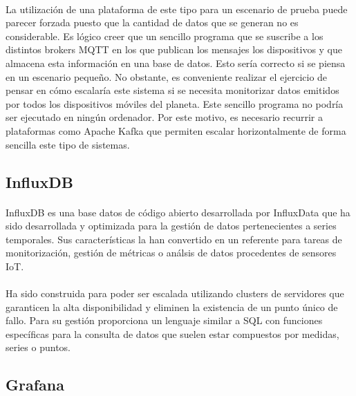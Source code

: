 \documentclass[12pt, a4paper]{article}
\begin{document}
        \paragraph{}
        La utilización de una plataforma de este tipo para un escenario de prueba puede parecer forzada puesto que la cantidad de datos que se generan no es considerable. Es lógico creer que un sencillo programa que se suscribe a los distintos brokers MQTT en los que publican los mensajes los dispositivos y que almacena esta información en una base de datos. Esto sería correcto si se piensa en un escenario pequeño. No obstante, es conveniente realizar el ejercicio de pensar en cómo escalaría este sistema si se necesita monitorizar datos emitidos por todos los dispositivos móviles del planeta. Este sencillo programa no podría ser ejecutado en ningún ordenador. Por este motivo, es necesario recurrir a plataformas como Apache Kafka que permiten escalar horizontalmente de forma sencilla este tipo de sistemas.
        
        \subsection{InfluxDB}

        \paragraph{}
        InfluxDB es una base datos de código abierto desarrollada por InfluxData que ha sido desarrollada y optimizada para la gestión de datos pertenecientes a series temporales. Sus características la han convertido en un referente para tareas de monitorización, gestión de métricas o análsis de datos procedentes de sensores IoT.

        \paragraph{}
        Ha sido construida para poder ser escalada utilizando clusters de servidores que garanticen la alta disponibilidad y eliminen la existencia de un punto único de fallo. Para su gestión proporciona un lenguaje similar a SQL con funciones específicas para la consulta de datos que suelen estar compuestos por medidas, series o puntos.

        \subsection{Grafana}
\end{document}
